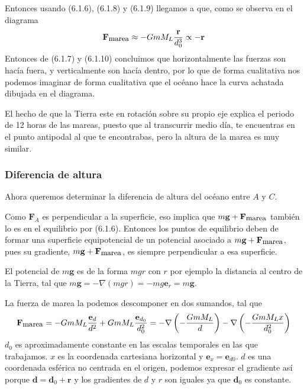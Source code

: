 Entonces usando (6.1.6), (6.1.8) y (6.1.9) llegamos a que, como se observa en el diagrama
\begin{equation} \label{6.1.1}
    \mathbf{F}_{\mbox{\small marea}}\approx-GmM_L\frac{\mathbf{r}}{d_0^3} \propto -\mathbf{r}
\end{equation} 
Entonces de (6.1.7) y (6.1.10) concluimos que horizontalmente las fuerzas son hacía fuera, y verticalmente son hacía dentro, por lo que de forma cualitativa nos podemos imaginar de forma cualitativa que el océano hace la curva achatada dibujada en el diagrama.

El hecho de que la Tierra este en rotación sobre su propio eje explica el periodo de 12 horas de las mareas, puesto que al transcurrir medio día, te encuentras en el punto antipodal al que te encontrabas, pero la altura de la marea es muy similar.

\subsubsection{Diferencia de altura}
Ahora queremos determinar la diferencia de altura del océano entre $A$ y $C$.

Como $\mathbf{F}_A$ es perpendicular a la superficie, eso implica que $m\mathbf{g}+\mathbf{F}_{\mbox{\small marea}}$ también lo es en el equilibrio por (6.1.6). Entonces los puntos de equilibrio deben de formar una superficie equipotencial de un potencial asociado a $m\mathbf{g}+\mathbf{F}_{\mbox{\small marea}}$, pues su gradiente, $m\mathbf{g}+\mathbf{F}_{\mbox{\small marea}}$, es siempre perpendicular a esa superficie.

El potencial de $m\mathbf{g}$ es de la forma $mgr$ con $r$ por ejemplo la distancia al centro de la Tierra, tal que $m\mathbf{g}=-\nabla(mgr)=-mg\mathbf{e}_r=m\mathbf{g}$.

La fuerza de marea la podemos descomponer en dos sumandos, tal que
\begin{equation} \label{6.1.1}
    \mathbf{F}_{\mbox{\small marea}}= -GmM_L\frac{\mathbf{e}_d}{d^2}+GmM_L\frac{\mathbf{e}_{d_0}}{d_0^2}=-\nabla\left(-\frac{GmM_L}{d}\right)-\nabla\left(-\frac{GmM_Lx}{d_0^2}\right)
\end{equation} 
$d_0$ es aproximadamente constante en las escalas temporales en las que trabajamos. $x$ es la coordenada cartesiana horizontal y $\mathbf{e}_x=\mathbf{e}_{d0}$. $d$ es una coordenada esférica no centrada en el origen, podemos expresar el gradiente así porque $\mathbf{d}=\mathbf{d}_0+\mathbf{r}$ y los gradientes de $d$ y $r$ son iguales ya que $\mathbf{d}_0$ es constante.


